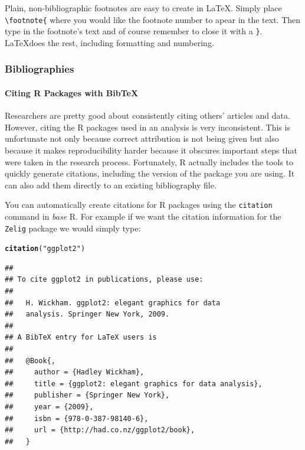 \documentclass[ChapterTOCs,krantz1]{krantz}\usepackage{graphicx, color}
\makeatletter
\newcommand{\hlfunctioncall}[1]{\textcolor[rgb]{0.501960784313725,0,0.329411764705882}{\textbf{#1}}}%
\newcommand{\hlstring}[1]{\textcolor[rgb]{0.6,0.6,1}{#1}}%
\newenvironment{kframe}{%
 \def\at@end@of@kframe{}%
 \ifinner\ifhmode%
  \def\at@end@of@kframe{\end{minipage}}%
  \begin{minipage}{\columnwidth}%
 \fi\fi%
 \def\FrameCommand##1{\hskip\@totalleftmargin \hskip-\fboxsep
 \colorbox{shadecolor}{##1}\hskip-\fboxsep
     \hskip-\linewidth \hskip-\@totalleftmargin \hskip\columnwidth}%
 \MakeFramed {\advance\hsize-\width
   \@totalleftmargin\z@ \linewidth\hsize
   \@setminipage}}%
 {\par\unskip\endMakeFramed%
 \at@end@of@kframe}
\newenvironment{knitrout}{}{} %
\makeatother
\begin{document}
Plain, non-bibliographic footnotes are easy to create in \LaTeX. Simply place \texttt{\textbackslash{}footnote\{} where you would like the footnote number to apear in the text. Then type in the footnote's text and of course remember to close it with a \texttt{\}}. \LaTeX does the rest, including formatting and numbering.

\subsubsection{Bibliographies}

\paragraph{Citing R Packages with BibTeX}

Researchers are pretty good about consistently citing others' articles and data. However, citing the R packages used in an analysis is very inconsistent. This is unfortunate not only because correct attribution is not being given but also because it makes reproducibility harder because it obscures important steps that were taken in the
research process. Fortunately, R actually includes the tools to quickly generate citations, including the version of the package you are using. It can also add them directly to an existing bibliography file.

You can automatically create citations for R packages using the \texttt{citation} command in \emph{base} R. For example if we want the citation information for the \texttt{Zelig} package we would simply type:

\begin{knitrout}
\color{fgcolor}\begin{kframe}
\begin{alltt}
\hlfunctioncall{citation}(\hlstring{"ggplot2"})
\end{alltt}
\begin{verbatim}
## 
## To cite ggplot2 in publications, please use:
## 
##   H. Wickham. ggplot2: elegant graphics for data
##   analysis. Springer New York, 2009.
## 
## A BibTeX entry for LaTeX users is
## 
##   @Book{,
##     author = {Hadley Wickham},
##     title = {ggplot2: elegant graphics for data analysis},
##     publisher = {Springer New York},
##     year = {2009},
##     isbn = {978-0-387-98140-6},
##     url = {http://had.co.nz/ggplot2/book},
##   }
\end{verbatim}
\end{kframe}
\end{knitrout}
\end{document}
